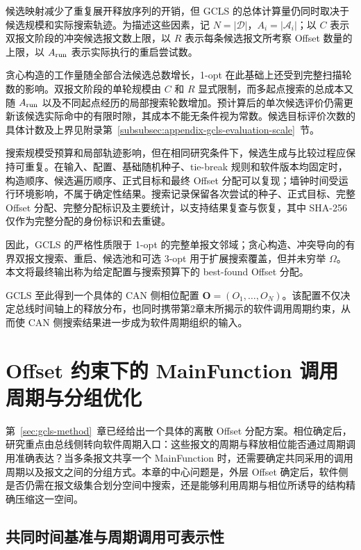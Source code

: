 \documentclass[UTF8,a4paper,twoside,zihao=-4]{ctexart}
\numberwithin{equation}{section}
\numberwithin{figure}{section}
\numberwithin{table}{section}
\theoremstyle{definition}
\newcommand{\Oset}{\mathcal{A}}
\numberwithin{algocf}{section}
\begin{document}
候选映射减少了重复展开释放序列的开销，但 GCLS 的总体计算量仍同时取决于候选规模和实际搜索轨迹。为描述这些因素，记 $N=|\mathcal D|$，$A_i=|\Oset_i|$；以 $C$ 表示双报文阶段的冲突候选报文数上限，以 $R$ 表示每条候选报文所考察 Offset 数量的上限，以 $A_{\rm run}$ 表示实际执行的重启尝试数。

贪心构造的工作量随全部合法候选总数增长，1-opt 在此基础上还受到完整扫描轮数的影响。双报文阶段的单轮规模由 $C$ 和 $R$ 显式限制，而多起点搜索的总成本又随 $A_{\rm run}$ 以及不同起点经历的局部搜索轮数增加。预计算后的单次候选评价仍需更新该候选实际命中的有限时隙，其成本不能无条件视为常数。候选目标评价次数的具体计数及上界见附录第~\ref{subsubsec:appendix-gcls-evaluation-scale}~节。

搜索规模受预算和局部轨迹影响，但在相同研究条件下，候选生成与比较过程应保持可重复。在输入、配置、基础随机种子、tie-break 规则和软件版本均固定时，构造顺序、候选遍历顺序、正式目标和最终 Offset 分配可以复现；墙钟时间受运行环境影响，不属于确定性结果。搜索记录保留各次尝试的种子、正式目标、完整 Offset 分配、完整分配标识及主要统计，以支持结果复查与恢复，其中 SHA-256 仅作为完整分配的身份标识和去重键。

因此，GCLS 的严格性质限于 1-opt 的完整单报文邻域；贪心构造、冲突导向的有界双报文搜索、重启、候选池和可选 3-opt 用于扩展搜索覆盖，但并未穷举 $\Omega$。本文将最终输出称为给定配置与搜索预算下的 best-found Offset 分配。

GCLS 至此得到一个具体的 CAN 侧相位配置 $\symbf O=(O_1,\ldots,O_N)$。该配置不仅决定总线时间轴上的释放分布，也同时携带第2章末所揭示的软件调用周期约束，从而使 CAN 侧搜索结果进一步成为软件周期组织的输入。

\clearpage
\section{Offset 约束下的 MainFunction 调用周期与分组优化}
\label{sec:main-function-exact}

第~\ref{sec:gcls-method}~章已经给出一个具体的离散 Offset 分配方案。相位确定后，研究重点由总线侧转向软件周期入口：这些报文的周期与释放相位能否通过周期调用准确表达？当多条报文共享一个 MainFunction 时，还需要确定共同采用的调用周期以及报文之间的分组方式。本章的中心问题是，外层 Offset 确定后，软件侧是否仍需在报文级集合划分空间中搜索，还是能够利用周期与相位所诱导的结构精确压缩这一空间。

\subsection{共同时间基准与周期调用可表示性}
\label{subsec:integer-tick-alignment}
\end{document}

